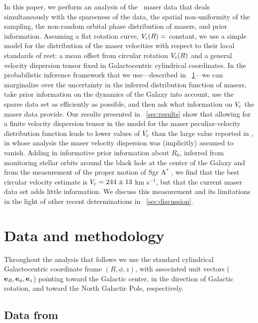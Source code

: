 In this paper, we perform an analysis of the \reid\ maser data that
deals simultaneously with the sparseness of the data, the spatial
non-uniformity of the sampling, the non-random orbital phase
distribution of masers, and prior information. Assuming a flat
rotation curve, $V_c(R) = $ constant, we use a simple model for the
distribution of the maser velocities with respect to their local
standards of rest: a mean offset from circular rotation $V_c(R)$ and a
general velocity dispersion tensor fixed in Galactocentric cylindrical
coordinates. In the probabilistic inference framework that we
use---described in \sectionname~\ref{sec:data}---we can marginalize
over the uncertainty in the inferred distribution function of masers,
take prior information on the dynamics of the Galaxy into account, use
the sparse data set as efficiently as possible, and then ask what
information on $V_c$ the maser data provide. Our results presented in
\sectionname~\ref{sec:results} show that allowing for a finite
velocity dispersion tensor in the model for the maser
peculiar-velocity distribution function leads to lower values of $V_c$
than the large value reported in \reid, in whose analysis the maser
velocity dispersion was (implicitly) assumed to vanish.  Adding in
informative prior information about $R_0$, inferred from monitoring
stellar orbits around the black hole at the center of the Galaxy
\citep{Ghez08a,Gillessen09a} and from the measurement of the proper
motion of Sgr A$^*$ \citep{Reid04a}, we find that the best circular
velocity estimate is $V_c = 244 \pm 13$ km s$^{-1}$, but that the
current maser data set adds little information. We discuss this
measurement and its limitations in the light of other recent
determinations in \sectionname~\ref{sec:discussion}.


\section{Data and methodology}\label{sec:data}

Throughout the analysis that follows we use the standard cylindrical
Galactocentric coordinate frame $(R,\phi,z)$, with associated unit
vectors ($\mathbf{e}_{R},\mathbf{e}_{\phi},\mathbf{e}_{z}$) pointing toward the Galactic
center, in the direction of Galactic rotation, and toward the North
Galactic Pole, respectively.

\subsection{Data from \protect\citet{Reid09a}}\label{sec:datasub}

